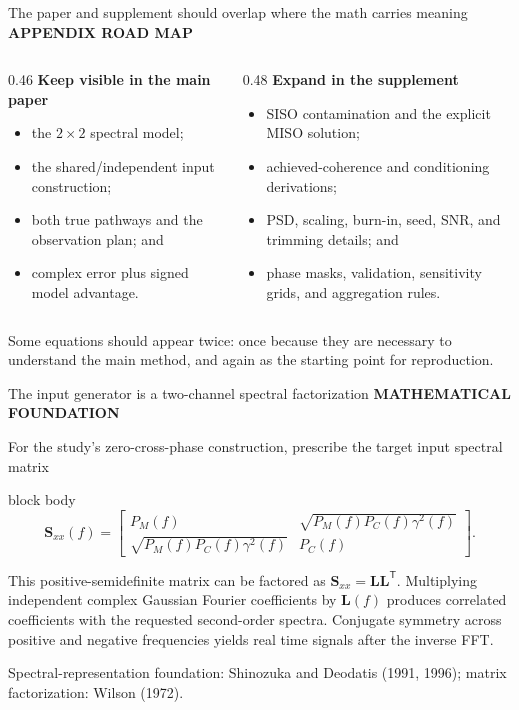 \documentclass[aspectratio=169,11pt]{beamer}
\newcommand{\sectionlabel}[1]{%
  {\color{Accent}\fontsize{8}{9.5}\selectfont\bfseries\MakeUppercase{#1}}\par\vspace{0.12cm}}
\newcommand{\sourcefooter}[1]{%
  \par\vfill{\color{Muted}\fontsize{6.8}{8}\selectfont #1}}
\newenvironment{equationcallout}
  {\begin{beamercolorbox}[rounded=true,sep=0.28cm,center,wd=0.94\textwidth]{block body}%
   \setbeamercolor{block body}{bg=AccentLight,fg=Ink}\large}
  {\end{beamercolorbox}}
\begin{document}
\begin{frame}{The paper and supplement should overlap where the math carries meaning}
\sectionlabel{Appendix Road Map}
\fontsize{10.4}{13.0}\selectfont
\begin{columns}[T,onlytextwidth]
\begin{column}{0.46\textwidth}
\textbf{Keep visible in the main paper}
\begin{itemize}
  \item the $2\times2$ spectral model;
  \item the shared/independent input construction;
  \item both true pathways and the observation plan; and
  \item complex error plus signed model advantage.
\end{itemize}
\end{column}
\begin{column}{0.48\textwidth}
\textbf{Expand in the supplement}
\begin{itemize}
  \item SISO contamination and the explicit MISO solution;
  \item achieved-coherence and conditioning derivations;
  \item PSD, scaling, burn-in, seed, SNR, and trimming details; and
  \item phase masks, validation, sensitivity grids, and aggregation rules.
\end{itemize}
\end{column}
\end{columns}

\vspace{0.10cm}
Some equations should appear twice: once because they are necessary to
understand the main method, and again as the starting point for reproduction.
\end{frame}

\begin{frame}{The input generator is a two-channel spectral factorization}
\sectionlabel{Mathematical Foundation}
For the study's zero-cross-phase construction, prescribe the target input
spectral matrix

\vspace{0.12cm}
\begin{equationcallout}
\[
\mathbf S_{xx}(f)=
\begin{bmatrix}
P_M(f) & \sqrt{P_M(f)P_C(f)\gamma^2(f)}\\
\sqrt{P_M(f)P_C(f)\gamma^2(f)} & P_C(f)
\end{bmatrix}.
\]
\end{equationcallout}

\vspace{0.14cm}
This positive-semidefinite matrix can be factored as
$\mathbf S_{xx}=\mathbf L\mathbf L^{\mathsf T}$. Multiplying independent
complex Gaussian Fourier coefficients by $\mathbf L(f)$ produces correlated
coefficients with the requested second-order spectra. Conjugate symmetry across
positive and negative frequencies yields real time signals after the inverse FFT.
\sourcefooter{Spectral-representation foundation: Shinozuka and Deodatis (1991, 1996); matrix factorization: Wilson (1972).}
\end{frame}
\end{document}
